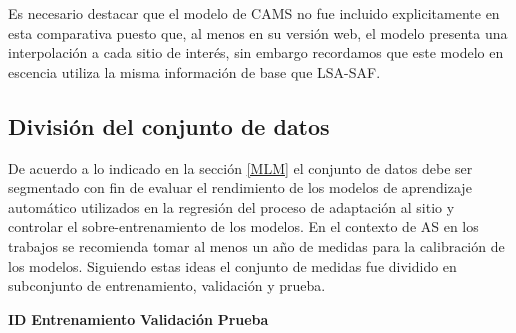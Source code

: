 \documentclass[letterpaper,12pt, twoside]{report}
\providecommand{\DIFdeltex}[1]{{\protect\color{red} \scriptsize #1}} %
\providecommand{\DIFdelFL}[1]{\DIFdel{#1}} %
\providecommand{\DIFdel}[1]{\texorpdfstring{\DIFdeltex{#1}}{}} %
\begin{document}
\DIFdel{Es necesario destacar que el modelo de CAMS no fue incluido explicitamente en esta comparativa puesto que, al menos en su versión web, el modelo presenta una interpolación a cada sitio de interés, sin embargo recordamos que este modelo en escencia utiliza la misma información de base que LSA-SAF.
}%

\subsection{\DIFdel{División del conjunto de datos}}
\addtocounter{subsection}{-1}%
\DIFdel{De acuerdo a lo indicado en la sección \ref{MLM} el conjunto de datos debe ser segmentado con fin de evaluar el rendimiento de los modelos de aprendizaje automático utilizados en la regresión del proceso de adaptación al sitio y controlar el sobre-entrenamiento de los modelos. En el contexto de AS en los trabajos \cite{POLO2016, POLO2020} se recomienda tomar al menos un año de medidas para la calibración de los modelos. Siguiendo estas ideas el conjunto de medidas fue dividido en subconjunto de entrenamiento, validación y prueba.  
}%

\DIFdelFL{\textbf{ID} }%
\DIFdelFL{\textbf{Entrenamiento} }%
\DIFdelFL{\textbf{Validación} }%
\DIFdelFL{\textbf{Prueba}}%
\end{document}

